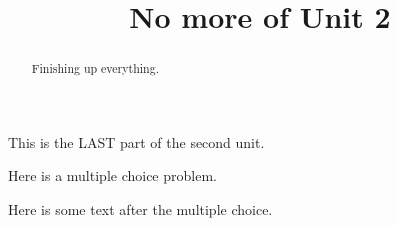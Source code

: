 \documentclass{ximera}
\title{No more of Unit 2}
\begin{document}
\begin{abstract}
  Finishing up everything.
\end{abstract}

This is the LAST part of the second unit.

\begin{exercise}
  Here is a multiple choice problem.
  \begin{solution}
    \begin{multiple-choice}
    \end{multiple-choice}
  \end{solution}

  Here is some text after the multiple choice.
\end{exercise}
\end{document}
